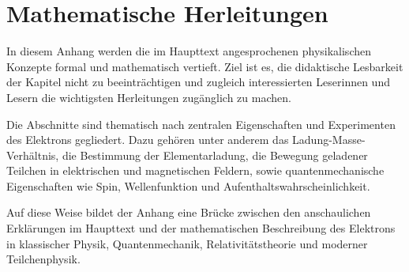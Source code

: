
\cleardoublepage
\appendix
\setcounter{chapter}{0} %
\renewcommand{\thechapter}{\Alph{chapter}}
\renewcommand{\thesection}{\thechapter.\arabic{section}}
\renewcommand{\thesubsection}{\thesection.\arabic{subsection}}
\renewcommand{\thesubsubsection}{\thesubsection.\arabic{subsubsection}}

\renewcommand{\theHchapter}{app.\Alph{chapter}}
\renewcommand{\theHsection}{\theHchapter.\arabic{section}}
\renewcommand{\theHsubsection}{\theHsection.\arabic{subsection}}
\renewcommand{\theHsubsubsection}{\theHsubsection.\arabic{subsubsection}}
\chapter{Mathematische Herleitungen}
\label{app:mathematische-herleitungen}

In diesem Anhang werden die im Haupttext angesprochenen physikalischen Konzepte
formal und mathematisch vertieft. Ziel ist es, die didaktische Lesbarkeit der
Kapitel nicht zu beeinträchtigen und zugleich interessierten Leserinnen und Lesern
die wichtigsten Herleitungen zugänglich zu machen.

Die Abschnitte sind thematisch nach zentralen Eigenschaften und Experimenten des
Elektrons gegliedert. Dazu gehören unter anderem das
Ladung-Masse-Verhältnis, die Bestimmung der
Elementarladung, die Bewegung geladener Teilchen in
elektrischen und magnetischen Feldern,
sowie quantenmechanische Eigenschaften wie Spin, Wellenfunktion
und Aufenthaltswahrscheinlichkeit.

Auf diese Weise bildet der Anhang eine Brücke zwischen den anschaulichen Erklärungen
im Haupttext und der mathematischen Beschreibung des Elektrons in klassischer Physik,
Quantenmechanik, Relativitätstheorie
und moderner Teilchenphysik.



